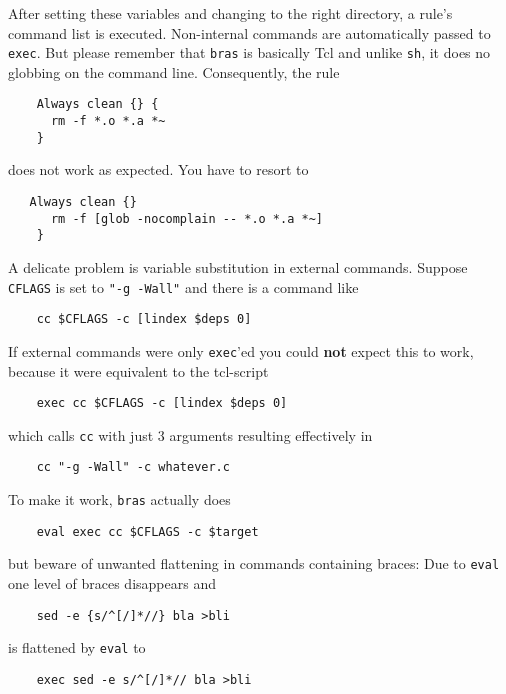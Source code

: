 \documentclass[12pt]{article}
\newcommand{\bras}{\texttt{bras}}
\begin{document}
After setting these variables and changing to the right directory, a
rule's command list is executed. Non-internal commands are
automatically passed to \texttt{exec}. But please remember that
\bras{} is basically Tcl and unlike \texttt{sh}, it does no globbing
on the command line. Consequently, the rule
\begin{verbatim}
    Always clean {} {
      rm -f *.o *.a *~
    }
\end{verbatim}
does not work as expected. You have to resort to
\begin{verbatim}
   Always clean {}
      rm -f [glob -nocomplain -- *.o *.a *~]
    }
\end{verbatim}
    
A delicate problem is variable substitution in
external commands. Suppose \texttt{CFLAGS} is set to 
\texttt{"-g -Wall"} and there is a command like 

\begin{verbatim}
    cc $CFLAGS -c [lindex $deps 0]
\end{verbatim}

If external commands were only \texttt{exec}'ed you could \textbf{not}
expect this to work, because it were equivalent to the tcl-script

\begin{verbatim}
    exec cc $CFLAGS -c [lindex $deps 0]
\end{verbatim}

which calls \texttt{cc} with just 3 arguments resulting effectively in

\begin{verbatim}
    cc "-g -Wall" -c whatever.c
\end{verbatim}

To make it work, \bras{} actually does

\begin{verbatim}
    eval exec cc $CFLAGS -c $target
\end{verbatim}

but beware of unwanted flattening in commands containing braces: Due
to \texttt{eval} one level of braces
disappears and

\begin{verbatim}
    sed -e {s/^[/]*//} bla >bli
\end{verbatim}

is flattened by \texttt{eval} to

\begin{verbatim}
    exec sed -e s/^[/]*// bla >bli
\end{verbatim}
\end{document}
